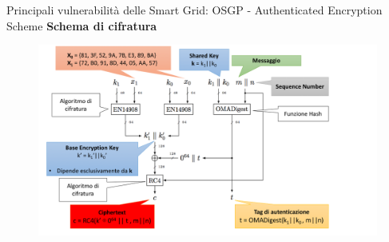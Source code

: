 \begin{frame}{Principali vulnerabilità delle Smart Grid: OSGP - Authenticated Encryption Scheme}
	\textbf{Schema di cifratura}
	\begin{figure}[h]
		\includegraphics[scale=0.3,cfbox=blue_slides 1pt 0pt]{imgs/schemes/scheme-1(info).png}
	\end{figure}
\end{frame}

